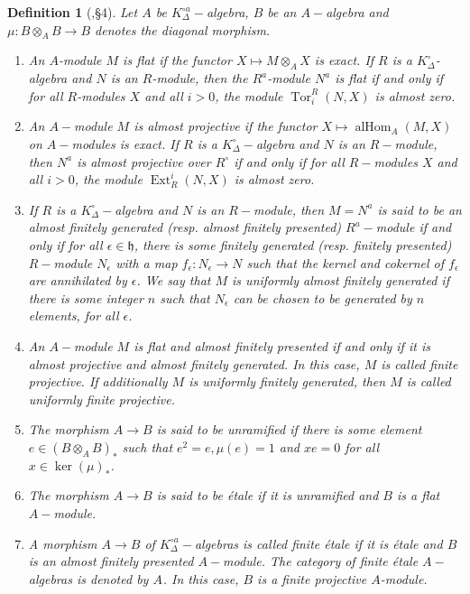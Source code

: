 \documentclass[12pts,a4paper]{amsart}
\newtheorem{definition}[proposition]{Definition}
\DeclareMathOperator{\alHom}{alHom}
\DeclareMathOperator{\Tor}{Tor}
\DeclareMathOperator{\Ext}{Ext}
\DeclareMathOperator{\fet}{f\acute{e}t}
\begin{document}
\begin{definition}[\cite{Sch},\S4]
    Let $A$ be $K^{\circ a}_\Delta-$algebra, $B$ be an $A-$algebra and $\mu:B\otimes_A B\to B$ denotes the diagonal morphism.
   \begin{enumerate}
    \item[(i)] An $A$-module $M$ is \emph{flat} if the functor $X \mapsto M \otimes_A X$ is exact. If $R$ is a $K^\circ_\Delta$-algebra and $N$ is an $R$-module, then the $R^a$-module $N^a$ is flat if and only if for all $R$-modules $X$ and all $i > 0$, the module $\Tor^R_i(N, X)$ is almost zero.
    \item[(ii)] An $A-$module $M$ is \emph{almost projective} if the functor $X\mapsto \alHom_A(M,X)$ on $A-$modules is exact. If $R$ is a $K^\circ_\Delta-$algebra and $N$ is an $R-$module, then $N^a$ is almost projective over $R^\circ$ if and only if for all $R-$modules $X$ and all $i>0$, the module $\Ext^i_R(N,X)$ is almost zero.
    \item[(iii)] If $R$ is a $K^\circ_\Delta-$algebra and $N$ is an $R-$module, then $M=N^a$ is said to be an \emph{almost finitely generated} (resp. \emph{almost finitely presented}) $R^a-$module if and only if for all $\epsilon\in\mathfrak{h}$, there is some finitely generated (resp. finitely presented) $R-$module $N_\epsilon$ with a map $f_\epsilon:N_\epsilon\to N$ such that  the kernel and cokernel of $f_\epsilon$ are annihilated by $\epsilon$. We say that $M$ is \emph{uniformly almost finitely generated} if there is some integer $n$ such that $N_\epsilon$ can be chosen to be generated by $n$ elements, for all $\epsilon$.
    \item[(iv)] An $A-$module $M$ is flat and almost finitely presented if and only if it is almost projective and almost finitely generated. In this case, $M$ is called \emph{finite projective}. If additionally $M$ is uniformly finitely generated, then $M$ is called \emph{uniformly finite projective}.
    \item[(v)] The morphism $A\to B$ is said to be \emph{unramified} if there is some element $e\in (B\otimes_A B)_*$ such that $e^2=e,\mu(e)=1$ and $xe=0$ for all $x\in\ker(\mu)_*$.
    \item[(vi)] The morphism $A\to B$ is said to be \emph{\'etale} if it is unramified and $B$ is a flat $A-$module.
    \item[(vii)] A morphism $A\to B$ of $K^{\circ a}_\Delta-$algebras is called \emph{finite \'etale} if it is \'etale and $B$ is an almost finitely presented $A-$module. The category of finite \'etale $A-$algebras is denoted by $A_{\fet}$. In this case, $B$ is a finite projective $A$-module.
   \end{enumerate}

\end{definition}
\end{document}
